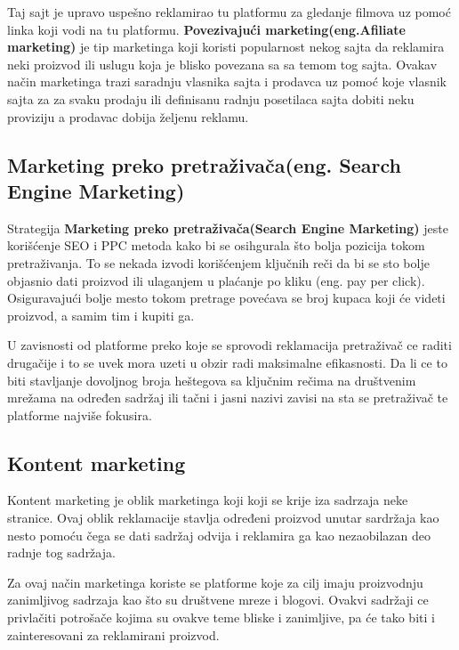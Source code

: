 \documentclass[a4paper]{article}
\begin{document}
{Taj sajt je upravo uspešno reklamirao tu platformu za gledanje filmova uz pomoć linka koji vodi na tu platformu. \textbf{Povezivajući marketing(eng.Afiliate marketing)} je tip marketinga koji koristi popularnost nekog sajta da reklamira neki proizvod ili uslugu koja je blisko povezana sa sa temom tog sajta. 
Ovakav način marketinga trazi saradnju vlasnika sajta i prodavca uz pomoć koje vlasnik sajta za za svaku prodaju ili definisanu radnju posetilaca sajta dobiti neku proviziju a prodavac dobija željenu reklamu.







\subsection{Marketing preko pretraživača(eng. Search Engine Marketing) }
\label{subsec:SAM}
Strategija \textbf{Marketing preko pretraživača(Search Engine Marketing)} jeste korišćenje SEO i PPC metoda kako bi se osihgurala što bolja pozicija tokom pretraživanja. To se nekada izvodi korišćenjem ključnih reči da bi se sto bolje objasnio dati proizvod ili ulaganjem u plaćanje po kliku (eng. pay per click). Osiguravajući bolje mesto tokom pretrage povećava se broj kupaca koji će videti proizvod, a samim tim i kupiti ga.

 U zavisnosti od platforme preko koje se sprovodi reklamacija pretraživač ce raditi drugačije i to se uvek mora uzeti u obzir radi maksimalne efikasnosti. Da li ce to biti stavljanje dovoljnog broja heštegova sa ključnim rečima na društvenim mrežama  na određen sadržaj ili tačni i jasni nazivi zavisi na sta se pretraživač te platforme najviše fokusira.


\subsection{Kontent marketing  }
\label{subsec:Kontent marketing}
Kontent marketing je oblik marketinga koji koji se krije iza sadrzaja neke stranice. Ovaj oblik reklamacije stavlja određeni proizvod unutar sardržaja kao nesto pomoću čega se dati sadržaj odvija i reklamira ga kao nezaobilazan deo radnje tog sadržaja. 

Za ovaj način marketinga koriste se platforme koje za cilj imaju proizvodnju zanimljivog sadrzaja kao što su društvene mreze i blogovi. Ovakvi sadržaji ce privlačiti potrošače kojima su ovakve teme bliske i zanimljive, pa će tako biti i zainteresovani za reklamirani proizvod. 

}
\end{document}
